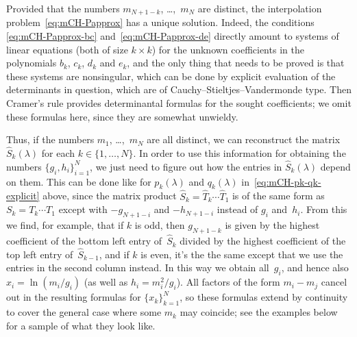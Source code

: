 \documentclass[10pt,a4paper]{article} \pdfoutput=1 
\begin{document}
Provided that the numbers $m_{N+1-k}$, \ldots,~$m_N$ are distinct,
the interpolation problem~\eqref{eq:mCH-Papprox} has a unique solution.
Indeed, the conditions \eqref{eq:mCH-Papprox-bc}
and~\eqref{eq:mCH-Papprox-de}
directly amount to systems of linear equations
(both of size $k \times k$)
for the unknown coefficients in the
polynomials $b_k$, $c_k$, $d_k$ and $e_k$, and the only thing that needs to
be proved is that these systems are nonsingular,
which can be done by explicit evaluation of the determinants in question,
which are of Cauchy--Stieltjes--Vandermonde type.
Then Cramer's rule provides determinantal formulas for the sought coefficients;
we omit these formulas here, since they are somewhat unwieldy.

Thus, if the numbers $m_1$, \dots,~$m_N$ are all distinct, we can reconstruct
the matrix $\widehat S_{k}(\lambda)$ for each $k \in \{1, \dots, N \}$.
In order to use this information for obtaining the numbers $\{ g_i, h_i \}_{i=1}^N$,
we just need to figure out how the entries in $\widehat S_{k}(\lambda)$ depend on them.
This can be done like for $p_k(\lambda)$ and $q_k(\lambda)$
in~\eqref{eq:mCH-pk-qk-explicit} above,
since the matrix product $\widehat S_{k} = \widehat T_k \dotsm \widehat T_1$
is of the same form as $S_k = T_k \dotsm T_1$ except with
$-g_{N+1-i}$ and $-h_{N+1-i}$ instead of $g_i$ and~$h_i$.
From this we find, for example, that if $k$ is odd, then
$g_{N+1-k}$ is given by the highest coefficient of the bottom left entry of~$\widehat S_k$
divided by the highest coefficient of the top left entry of~$\widehat S_{k-1}$,
and if $k$ is even, it's the the same except that we use the entries in the second column instead.
In this way we obtain all~$g_i$, and hence also $x_i = \ln(m_i/g_i)$
(as well as $h_i = m_i^2 / g_i$).
All factors of the form $m_i-m_j$ cancel out
in the resulting formulas for $\{ x_k \}_{k=1}^N$,
so these formulas extend by continuity to cover the general case
where some $m_k$ may coincide;
see the examples below for a sample of what they look like.
\end{document}
